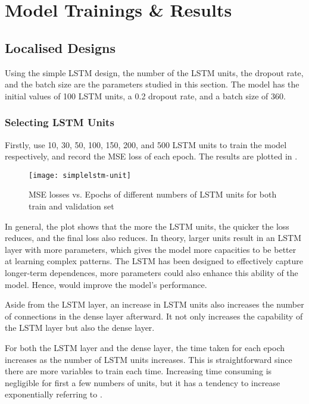 \chapter{Model Trainings \& Results} \label{Chapter:Results}

\section{Localised Designs}

Using the simple LSTM design, the number of the LSTM units, the dropout rate, and the batch size are the parameters studied in this section. 
The model has the initial values of 100 LSTM units, a 0.2 dropout rate, and a batch size of 360. 

\subsection{Selecting LSTM Units} \label{Section:units}

Firstly, use 10, 30, 50, 100, 150, 200, and 500 LSTM units to train the model respectively, and record the MSE loss of each epoch. 
The results are plotted in . 

\begin{figure}[!htb]
    \centering
    \texttt{[image: simplelstm-unit]}
    \caption{MSE losses vs. Epochs of different numbers of LSTM units for both train and validation set}
    \label{Figure:simplelstm-unit}
\end{figure}

In general, the plot shows that the more the LSTM units, the quicker the loss reduces, and the final loss also reduces. 
In theory, larger units result in an LSTM layer with more parameters, which gives the model more capacities to be better at learning complex patterns. 
The LSTM has been designed to effectively capture longer-term dependences, more parameters could also enhance this ability of the model.
Hence, would improve the model's performance. 

Aside from the LSTM layer, an increase in LSTM units also increases the number of connections in the dense layer afterward. 
It not only increases the capability of the LSTM layer but also the dense layer. 

For both the LSTM layer and the dense layer, the time taken for each epoch increases as the number of LSTM units increases. This is straightforward since there are more variables to train each time. 
Increasing time consuming is negligible for first a few numbers of units, but it has a tendency to increase exponentially referring to . 

